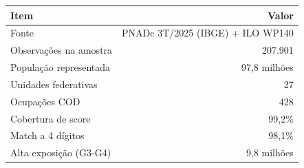 \scriptsize
\begin{tabular}{lr}
\toprule
Item & Valor \\
\midrule
Fonte & PNADc 3T/2025 (IBGE) + ILO WP140 \\
Observações na amostra & 207.901 \\
População representada & 97,8 milhões \\
Unidades federativas & 27 \\
Ocupações COD & 428 \\
Cobertura de score & 99,2\% \\
Match a 4 dígitos & 98,1\% \\
Alta exposição (G3-G4) & 9,8 milhões \\
\bottomrule
\end{tabular}
